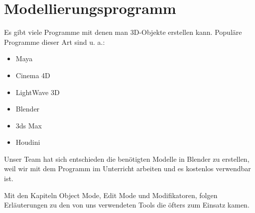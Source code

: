 \section{Modellierungsprogramm}
Es gibt viele Programme mit denen man 3D-Objekte erstellen kann.
\citep{wiki:modellierungsprogramm_beispiele} Populäre Programme dieser Art sind u. a.:

\begin{itemize}
    \item Maya
    \item Cinema 4D
    \item LightWave 3D
    \item Blender
    \item 3ds Max
    \item Houdini
\end{itemize}

Unser Team hat sich entschieden die benötigten Modelle in Blender zu erstellen, weil wir mit dem Programm im Unterricht arbeiten und
es kostenlos verwendbar ist.

Mit den Kapiteln Object Mode, Edit Mode und Modifikatoren, folgen Erläuterungen zu
den von uns verwendeten Tools die öfters zum Einsatz kamen.
